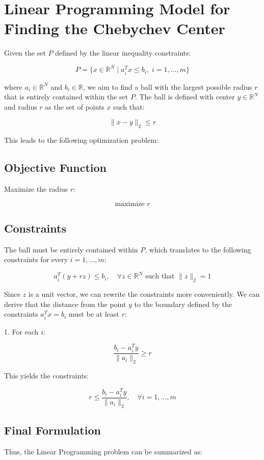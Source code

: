 \documentclass{article}
\begin{document}
\section*{Linear Programming Model for Finding the Chebychev Center}

Given the set \( P \) defined by the linear inequality constraints:

\[
P = \{ x \in \mathbb{R}^N \mid a_i^T x \leq b_i, \; i = 1, \ldots, m \}
\]

where \( a_i \in \mathbb{R}^N \) and \( b_i \in \mathbb{R} \), we aim to find a ball with the largest possible radius \( r \) that is entirely contained within the set \( P \). The ball is defined with center \( y \in \mathbb{R}^N \) and radius \( r \) as the set of points \( x \) such that:

\[
\| x - y \|_2 \leq r
\]

This leads to the following optimization problem:

\subsection*{Objective Function}
Maximize the radius \( r \):

\[
\text{maximize } r
\]

\subsection*{Constraints}
The ball must be entirely contained within \( P \), which translates to the following constraints for every \( i = 1, \ldots, m \):

\[
a_i^T (y + r z) \leq b_i, \quad \forall z \in \mathbb{R}^N \text{ such that } \| z \|_2 = 1
\]

Since \( z \) is a unit vector, we can rewrite the constraints more conveniently. We can derive that the distance from the point \( y \) to the boundary defined by the constraints \( a_i^T x = b_i \) must be at least \( r \):

1. For each \( i \):

\[
\frac{b_i - a_i^T y}{\| a_i \|_2} \geq r
\]

This yields the constraints:

\[
r \leq \frac{b_i - a_i^T y}{\| a_i \|_2}, \quad \forall i = 1, \ldots, m
\]

\subsection*{Final Formulation}
Thus, the Linear Programming problem can be summarized as:
\end{document}
